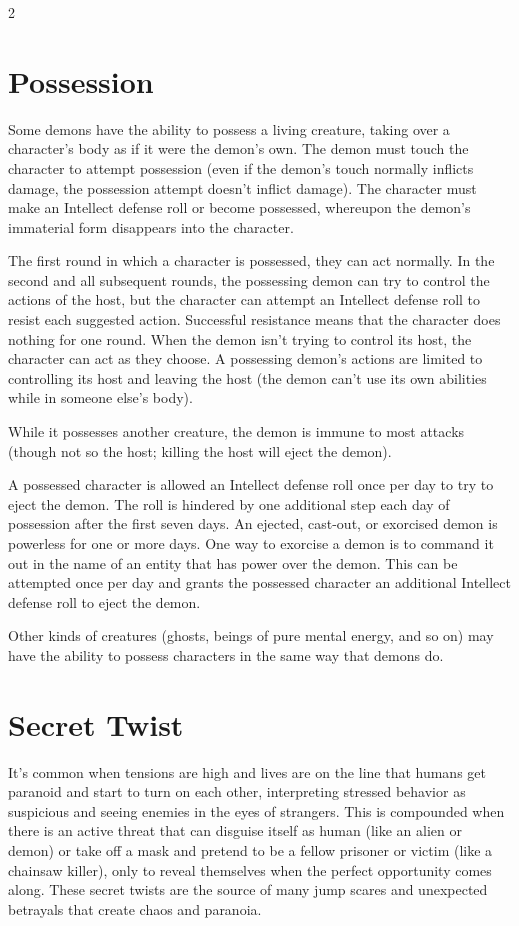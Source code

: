 \begin{multicols}{2}
\section{Possession}

Some demons have the ability to possess a living creature, taking over a character’s body as if it were the demon’s own. The demon must touch the character to attempt possession (even if the demon’s touch normally inflicts damage, the possession attempt doesn’t inflict damage). The character must make an Intellect defense roll or become possessed, whereupon the demon’s immaterial form disappears into the character.

The first round in which a character is possessed, they can act normally. In the second and all subsequent rounds, the possessing demon can try to control the actions of the host, but the character can attempt an Intellect defense roll to resist each suggested action. Successful resistance means that the character does nothing for one round. When the demon isn’t trying to control its host, the character can act as they choose. A possessing demon’s actions are limited to controlling its host and leaving the host (the demon can’t use its own abilities while in someone else’s body).

While it possesses another creature, the demon is immune to most attacks (though not so the host; killing the host will eject the demon).

A possessed character is allowed an Intellect defense roll once per day to try to eject the demon. The roll is hindered by one additional step each day of possession after the first seven days. An ejected, cast-out, or exorcised demon is powerless for one or more days. One way to exorcise a demon is to command it out in the name of an entity that has power over the demon. This can be attempted once per day and grants the possessed character an additional Intellect defense roll to eject the demon.

Other kinds of creatures (ghosts, beings of pure mental energy, and so on) may have the ability to possess characters in the same way that demons do.

\section{Secret Twist}

It’s common when tensions are high and lives are on the line that humans get paranoid and start to turn on each other, interpreting stressed behavior as suspicious and seeing enemies in the eyes of strangers. This is compounded when there is an active threat that can disguise itself as human (like an alien or demon) or take off a mask and pretend to be a fellow prisoner or victim (like a chainsaw killer), only to reveal themselves when the perfect opportunity comes along. These secret twists are the source of many jump scares and unexpected betrayals that create chaos and paranoia.


\end{multicols}
